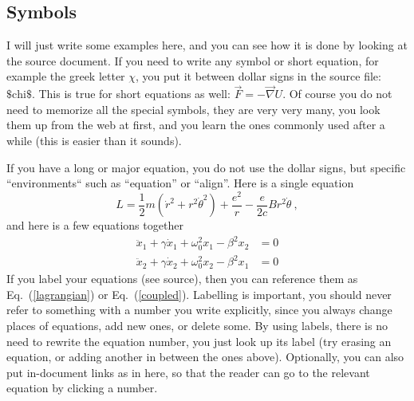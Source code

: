 \documentclass[aps,twocolumn,showpacs,preprintnumbers,nofootinbib,prl,superscriptaddress,groupedaddress]{revtex4-2}
\begin{document}
\subsection{Symbols}
I will just write some examples here, and you can see how it is done by looking at the source document. If you
need to write any symbol or short equation, for example the greek letter $\chi$, you put it between dollar signs
in the source file: $\$\textrm{chi}\$$. This is true for short equations as well: $\vec{F} = -\vec{\nabla}U$. Of
course you do not need to memorize all the special symbols, they are very very many, you look them up from
the web at first, and you learn the ones commonly used after a while (this is easier than it sounds).

If you have a long or major equation, you do not use the dollar signs, but specific ``environments`` such as
``equation'' or ``align''. Here is a single equation
\begin{equation}\label{lagrangian} 
L = \frac{1}{2}m(\dot{r}^2+r^2\dot{\theta}^2)+ \frac{e^2}{r}-\frac{e}{2c}Br^2 \dot{\theta} \ ,
\end{equation}
and here is a few equations together
\begin{align}\label{coupled}
\ddot{x}_1 +\gamma \dot{x}_1+\omega_0^2 x_1 -\beta^2 x_2 &= 0 \nonumber \\
\ddot{x}_2 +\gamma \dot{x}_2+\omega_0^2 x_2 -\beta^2 x_1 &= 0 
\end{align}
If you label your equations (see source), then you can reference them as Eq.~(\ref{lagrangian}) or Eq.~(\ref{coupled}).
Labelling is important, you should never refer to something with a number you write explicitly, since you always change
places of equations, add new ones, or delete some. By using labels, there is no need to rewrite the equation number,
you just look up its label (try erasing an equation, or adding another in between the ones above). Optionally, you can also put in-document links as in here, so that the reader can go to the relevant equation by clicking a number.
\end{document}
